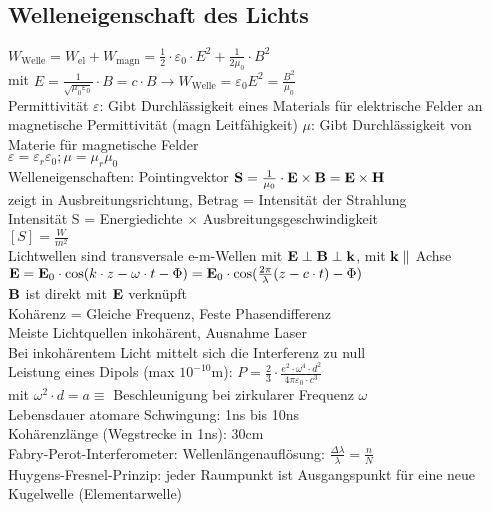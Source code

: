 \documentclass[fs, footer]{latex4ei}
\begin{document}
\begin{multicols*}{4}
\subsection{Welleneigenschaft des Lichts}
$W_{\text{Welle}} = W_{\text{el}}+W_{\text{magn}} = \frac{1}{2}\cdot\varepsilon_0\cdot E^2 + \frac{1}{2\mu_0}\cdot B^2$\\
mit $E = \frac{1}{\sqrt{\mu_0\varepsilon_0}}\cdot B = c\cdot B \rightarrow W_{\text{Welle}} = \varepsilon_0E^2 = \frac{B^2}{\mu_0}$\\
Permittivität $\varepsilon$: Gibt Durchlässigkeit eines Materials für elektrische Felder an\\
magnetische Permittivität (magn Leitfähigkeit) $\mu$: Gibt Durchlässigkeit von Materie für magnetische Felder\\
$\varepsilon = \varepsilon_r\varepsilon_0; \mu = \mu_r\mu_0$\\

Welleneigenschaften: 
Pointingvektor $\textbf{S}=\frac{1}{\mu_0}\cdot \textbf{E} \times \textbf{B} = \textbf{E} \times \textbf{H}$ \\
zeigt in Ausbreitungsrichtung, Betrag = Intensität der Strahlung\\
Intensität S = Energiedichte $\times$ Ausbreitungsgeschwindigkeit\\
$[S]  = \frac{W}{m^2}$\\
Lichtwellen sind transversale e-m-Wellen mit $\textbf{E}\perp \textbf{B} \perp\textbf{k}$, mit $\textbf{k} \parallel$ Achse\\
$\textbf{E} = \textbf{E}_0\cdot\cos(k\cdot z - \omega\cdot t - \Phi) = \textbf{E}_0\cdot \cos(\frac{2\pi}{\lambda}(z-c\cdot t)-\Phi)$\\
$\textbf{B}$ ist direkt mit $\textbf{E}$ verknüpft\\
Kohärenz = Gleiche Frequenz, Feste Phasendifferenz\\
Meiste Lichtquellen inkohärent, Ausnahme Laser\\
Bei inkohärentem Licht mittelt sich die Interferenz zu null\\

Leistung eines Dipols (max $10^{-10}$m): $P = \frac{2}{3}\cdot\frac{e^2\cdot\omega^4\cdot d^2}{4\pi\varepsilon_0\cdot c^3}$\\
mit $\omega^2\cdot d = a \equiv$ Beschleunigung bei zirkularer Frequenz $\omega$\\ 
Lebensdauer atomare Schwingung: 1ns bis 10ns\\
Kohärenzlänge (Wegstrecke in 1ns): 30cm\\
Fabry-Perot-Interferometer: Wellenlängenauflösung: $\frac{\Delta \lambda}{\lambda} = \frac{n}{N}$\\
Huygens-Fresnel-Prinzip: jeder Raumpunkt ist Ausgangspunkt für eine neue Kugelwelle (Elementarwelle)\\


\end{multicols*}
\end{document}
